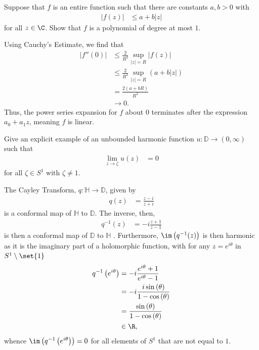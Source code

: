 \documentclass[10pt]{mypackage}
\renewcommand{\D}{\mathbb{D}}
\begin{document}
\begin{problem}[Problem 2]
  Suppose that $f$ is an entire function such that there are constants $a,b > 0$ with
  \begin{align*}
    \left\vert f(z) \right\vert &\leq a + b\left\vert z \right\vert
  \end{align*}
  for all $z\in \C$. Show that $f$ is a polynomial of degree at most $1$.
\end{problem}
\begin{solution}
  Using Cauchy's Estimate, we find that
  \begin{align*}
    \left\vert f''(0) \right\vert &\leq \frac{2}{R^2}\sup_{|z| = R} \left\vert f(z) \right\vert\\
                                  &\leq \frac{2}{R^2} \sup_{|z| = R} \left( a + b\left\vert z \right\vert \right)\\
                                  &= \frac{2\left( a + bR \right)}{R^2}\\
                                  &\rightarrow 0.
  \end{align*}
  Thus, the power series expansion for $f$ about $0$ terminates after the expression $a_0 + a_1 z$, meaning $f$ is linear.
\end{solution}
\begin{problem}[Problem 3]
  Give an explicit example of an unbounded harmonic function $u\colon \D\rightarrow \left( 0,\infty \right)$ such that
  \begin{align*}
    \lim_{z\rightarrow \zeta}u(z) &= 0
  \end{align*}
  for all $\zeta\in S^{1}$ with $\zeta\neq 1$.
\end{problem}
\begin{solution}
  The Cayley Transform, $q\colon \mathbb{H}\rightarrow \D$, given by
  \begin{align*}
    q(z) &= \frac{z-i}{z+i}
  \end{align*}
  is a conformal map of $ \mathbb{H} $ to $\D$. The inverse, then,
  \begin{align*}
    q^{-1}(z) &= -i\frac{z+1}{z-1}
  \end{align*}
  is then a conformal map of $ \D$ to $\mathbb{H} $ . Furthermore, $\im\left( q^{-1}(z) \right)$ is then harmonic as it is the imaginary part of a holomorphic function, with for any $z = e^{i\theta}$ in $S^{1}\setminus \set{1}$
  \begin{align*}
    q^{-1}\left( e^{i\theta} \right) &= -i\frac{e^{i\theta} + 1}{e^{i\theta} - 1}\\
                                     &= -i\frac{i\sin\left( \theta \right)}{1-\cos\left( \theta \right)}\\
                                     &= \frac{\sin\left( \theta \right)}{1-\cos\left( \theta \right)}\\
                                     &\in \R,
  \end{align*}
  whence $\im\left( q^{-1}\left( e^{i\theta} \right) \right) = 0$ for all elements of $S^{1}$ that are not equal to $1$.
\end{solution}
\end{document}

